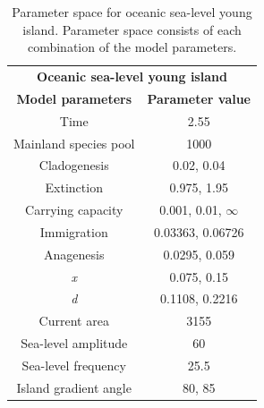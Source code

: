 \begin{table}[ht]
    \centering
    \caption{Parameter space for oceanic sea-level young island. Parameter space consists of each combination of the model parameters.}
    \begin{tabular}{ c | c }
        \multicolumn{2}{c}{\textbf{Oceanic sea-level young island}} \\
        \textbf{Model parameters} & \textbf{Parameter value} \\ 
        \hline
        \hline
        Time & 2.55 \\
        \hline
        Mainland species pool & 1000 \\
        \hline
        Cladogenesis & 0.02, 0.04 \\
        \hline
        Extinction & 0.975, 1.95 \\
        \hline
        Carrying capacity & 0.001, 0.01, $\infty$ \\
        \hline
        Immigration & 0.03363, 0.06726 \\
        \hline
        Anagenesis & 0.0295, 0.059 \\
        \hline
        \textit{x} & 0.075, 0.15 \\
        \hline
        \textit{d} & 0.1108, 0.2216 \\
        \hline
        Current area & 3155 \\
        \hline
        Sea-level amplitude & 60 \\
        \hline
        Sea-level frequency & 25.5 \\
        \hline
        Island gradient angle & 80, 85 \\
    \end{tabular}
    \label{tab:oceanic_sea_level_young}
\end{table}

